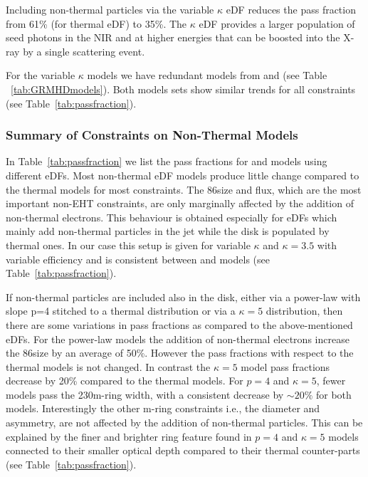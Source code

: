 
Including non-thermal particles via the variable $\kappa$ eDF reduces the pass fraction from 61\% (for thermal eDF) to 35\%.  The $\kappa$ eDF provides a larger population of seed photons in the NIR and at higher energies that can be boosted into the X-ray by a single scattering event.


For the variable $\kappa$ models we have redundant models from \bhac and \hamr (see Table ~\ref{tab:GRMHDmodels}).
Both models sets show similar trends for all constraints (see Table~\ref{tab:passfraction}).

\subsubsection{Summary of Constraints on Non-Thermal Models}



In Table~\ref{tab:passfraction} we list the pass fractions for \bhac and \hamr models using different eDFs.
Most non-thermal eDF models produce little change compared to the thermal models for most constraints.
The 86\GHz size and flux, which are the most important non-EHT constraints, are only marginally affected by the addition of non-thermal electrons.
This behaviour is obtained especially for eDFs which mainly add non-thermal particles in the jet while the disk is populated by thermal ones.
In our case this setup is given for variable $\kappa$ and $\kappa=3.5$ with variable efficiency and is consistent between \bhac and \hamr models (see Table~\ref{tab:passfraction}).

If non-thermal particles are included also in the disk, either via a power-law with slope p=4 stitched to a thermal distribution or via a $\kappa=5$ distribution, then there are some variations in pass fractions as compared to the above-mentioned eDFs.  For the power-law models the addition of non-thermal electrons increase the 86\GHz size by an average of 50\%.
However the pass fractions with respect to the thermal models is not changed.
In contrast the $\kappa=5$ model pass fractions decrease by 20\% compared to the thermal models.
For $p=4$ and $\kappa=5$, fewer models pass the 230\GHz m-ring width, with a consistent decrease by $\sim20\%$ for both models.
Interestingly the other m-ring constraints i.e., the diameter and asymmetry, are not affected by the addition of non-thermal particles.
This can be explained by the finer and brighter ring feature found in $p=4$ and $\kappa=5$ models connected to their smaller optical depth compared to their thermal counter-parts (see Table~\ref{tab:passfraction}).

